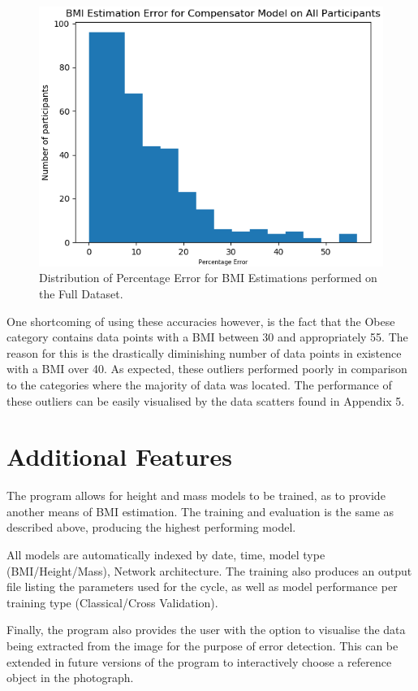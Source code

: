 \documentclass[conference]{IEEEtran}
\begin{document}
\begin{figure}
	\centering
	\includegraphics[width=0.6\linewidth]{errorspread.png}
	\caption{Distribution of Percentage Error for BMI Estimations performed on the Full Dataset.}
	\label{fig:errorspread}
\end{figure}

One shortcoming of using these accuracies however, is the fact that the Obese category contains data points with a BMI between 30 and appropriately 55.
The reason for this is the drastically diminishing number of data points in existence with a BMI over 40.
As expected, these outliers performed poorly in comparison to the categories where the majority of data was located.
The performance of these outliers can be easily visualised by the data scatters found in Appendix 5.

\section{Additional Features}
The program allows for height and mass models to be trained, as to provide another means of BMI estimation.
The training and evaluation is the same as described above, producing the highest performing model.

All models are automatically indexed by date, time, model type (BMI/Height/Mass), Network architecture.
The training also produces an output file listing the parameters used for the cycle, as well as model performance per training type (Classical/Cross Validation).

Finally, the program also provides the user with the option to visualise the data being extracted from the image for the purpose of error detection.
This can be extended in future versions of the program to interactively choose a reference object in the photograph.
\end{document}
